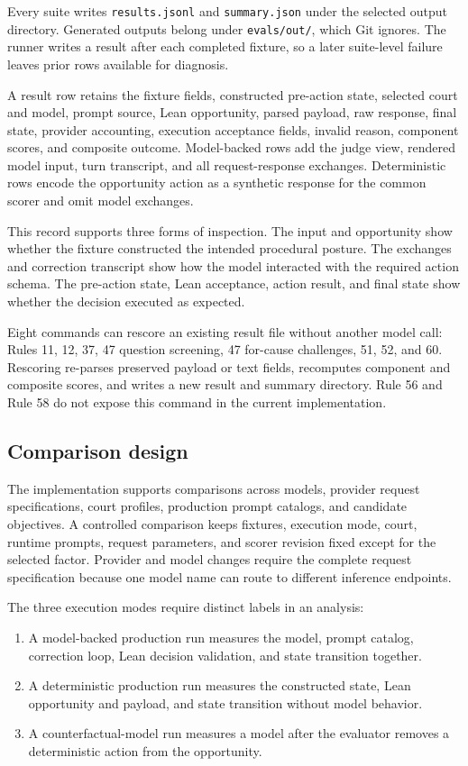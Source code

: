 \documentclass[11pt]{article}
\newcommand{\code}[1]{\texttt{#1}}
\begin{document}
Every suite writes \code{results.jsonl} and \code{summary.json} under the selected output directory.  Generated outputs belong under \code{evals/out/}, which Git ignores.  The runner writes a result after each completed fixture, so a later suite-level failure leaves prior rows available for diagnosis.

A result row retains the fixture fields, constructed pre-action state, selected court and model, prompt source, Lean opportunity, parsed payload, raw response, final state, provider accounting, execution acceptance fields, invalid reason, component scores, and composite outcome.  Model-backed rows add the judge view, rendered model input, turn transcript, and all request-response exchanges.  Deterministic rows encode the opportunity action as a synthetic response for the common scorer and omit model exchanges.

This record supports three forms of inspection.  The input and opportunity show whether the fixture constructed the intended procedural posture.  The exchanges and correction transcript show how the model interacted with the required action schema.  The pre-action state, Lean acceptance, action result, and final state show whether the decision executed as expected.

Eight commands can rescore an existing result file without another model call: Rules 11, 12, 37, 47 question screening, 47 for-cause challenges, 51, 52, and 60.  Rescoring re-parses preserved payload or text fields, recomputes component and composite scores, and writes a new result and summary directory.  Rule 56 and Rule 58 do not expose this command in the current implementation.

\subsection{Comparison design}

The implementation supports comparisons across models, provider request specifications, court profiles, production prompt catalogs, and candidate objectives.  A controlled comparison keeps fixtures, execution mode, court, runtime prompts, request parameters, and scorer revision fixed except for the selected factor.  Provider and model changes require the complete request specification because one model name can route to different inference endpoints.

The three execution modes require distinct labels in an analysis:

\begin{enumerate}
\item A model-backed production run measures the model, prompt catalog, correction loop, Lean decision validation, and state transition together.
\item A deterministic production run measures the constructed state, Lean opportunity and payload, and state transition without model behavior.
\item A counterfactual-model run measures a model after the evaluator removes a deterministic action from the opportunity.
\end{enumerate}
\end{document}
